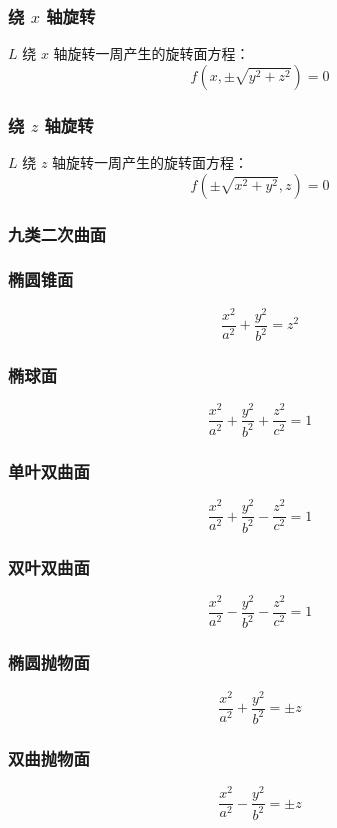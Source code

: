 \documentclass[UTF8]{ctexart}
\theoremstyle{remark}
\begin{document}
			\subsubsection*{绕 \( x \) 轴旋转}  
			\( L \) 绕 \( x \) 轴旋转一周产生的旋转面方程：  
			\[ f\left(x, \pm \sqrt{y^2 + z^2}\right) = 0 \]  
			
			\subsubsection*{绕 \( z \) 轴旋转}  
			\( L \) 绕 \( z \) 轴旋转一周产生的旋转面方程：  
			\[ f\left(\pm \sqrt{x^2 + y^2}, z\right) = 0 \]  
			
			
			\subsubsection{九类二次曲面}
			\subsubsection*{椭圆锥面}  
			\[ \frac{x^2}{a^2} + \frac{y^2}{b^2} = z^2 \]  
			
			\subsubsection*{椭球面}  
			\[ \frac{x^2}{a^2} + \frac{y^2}{b^2} + \frac{z^2}{c^2} = 1 \]  
			
			\subsubsection*{单叶双曲面}  
			\[ \frac{x^2}{a^2} + \frac{y^2}{b^2} - \frac{z^2}{c^2} = 1 \]  
			
			\subsubsection*{双叶双曲面}  
			\[ \frac{x^2}{a^2} - \frac{y^2}{b^2} - \frac{z^2}{c^2} = 1 \]  
			
			\subsubsection*{椭圆抛物面}  
			\[ \frac{x^2}{a^2} + \frac{y^2}{b^2} = \pm z \]  
			
			\subsubsection*{双曲抛物面}  
			\[ \frac{x^2}{a^2} - \frac{y^2}{b^2} = \pm z \]  
			
\end{document}
